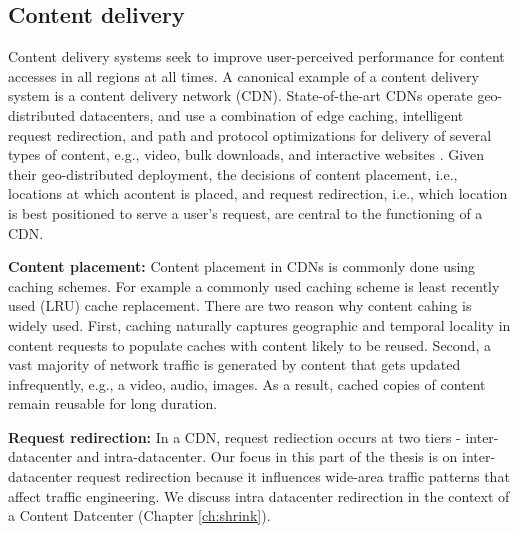 %
%
%


\subsection{Content delivery}
\label{sec:ch2-cdn}

Content delivery systems seek to improve user-perceived performance for content accesses in all regions  at all times. A canonical example of a content delivery system is a content delivery network (CDN). State-of-the-art CDNs operate geo-distributed datacenters, and use a combination of edge caching, intelligent request redirection, and path and protocol optimizations for delivery of several types of content, e.g., video, bulk downloads, and interactive websites \cite{DilleyMPPSW02,akamai-overview}. Given their geo-distributed deployment, the decisions of content placement, i.e., locations at which acontent is placed, and request redirection, i.e., which location is best positioned to serve a user's request, are central to the functioning of a CDN.

\textbf{Content placement:} Content placement in CDNs is commonly done using caching schemes. For example a commonly used caching scheme is least recently used (LRU) cache replacement. There are two reason why content cahing is widely used. First, caching naturally captures geographic and temporal locality in content requests to populate caches with content likely to be reused. Second, a vast majority of network traffic is generated by content that gets updated infrequently, e.g., a video, audio, images. As a result, cached copies of content remain reusable for long duration. 


\textbf{Request redirection:} In a CDN, request rediection occurs at two tiers - inter-datacenter and intra-datacenter. Our focus in this part of the thesis is on inter-datacenter request redirection because it influences wide-area traffic patterns that affect traffic engineering. We discuss intra datacenter redirection in the context of a Content Datcenter (Chapter \ref{ch:shrink}).

